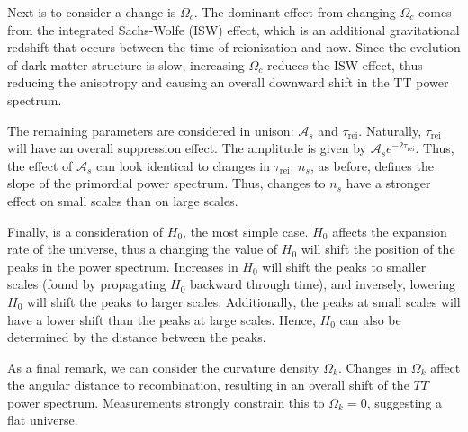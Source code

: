Next is to consider a change is $\Omega_c$. The dominant effect from changing $\Omega_c$ comes from the integrated Sachs-Wolfe (ISW) effect, which is an additional gravitational redshift that occurs between the time of reionization and now. Since the evolution of dark matter structure is slow, increasing $\Omega_c$ reduces the ISW effect, thus reducing the anisotropy and causing an overall downward shift in the TT power spectrum.

The remaining parameters are considered in unison: $\mathcal{A}_s$ and $\tau_{\mathrm{rei}}$. Naturally, $\tau_{\mathrm{rei}}$ will have an overall suppression effect. The amplitude is given by $\mathcal{A}_se^{-2\tau_{\mathrm{rei}}}$. Thus, the effect of $\mathcal{A}_s$ can look identical to changes in $\tau_\mathrm{rei}$. $n_s$, as before, defines the slope of the primordial power spectrum. Thus, changes to $n_s$ have a stronger effect on small scales than on large scales.

Finally, is a consideration of $H_0$, the most simple case. $H_0$ affects the expansion rate of the universe, thus a changing the value of $H_0$ will shift the position of the peaks in the power spectrum. Increases in $H_0$ will shift the peaks to smaller scales (found by propagating $H_0$ backward through time), and inversely, lowering $H_0$ will shift the peaks to larger scales. Additionally, the peaks at small scales will have a lower shift than the peaks at large scales. Hence, $H_0$ can also be determined by the distance between the peaks.

As a final remark, we can consider the curvature density $\Omega_k$. Changes in $\Omega_k$ affect the angular distance to recombination, resulting in an overall shift of the $TT$ power spectrum. Measurements strongly constrain this to $\Omega_k=0$, suggesting a flat universe.

